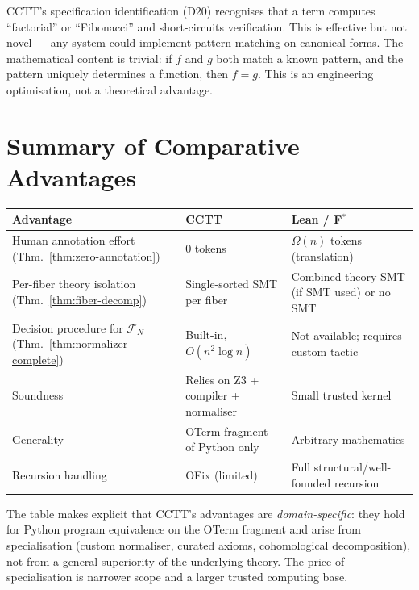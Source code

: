 CCTT's specification identification (D20) recognises that a term
computes ``factorial'' or ``Fibonacci'' and short-circuits verification.
This is effective but not novel — any system could implement
pattern matching on canonical forms.  The mathematical content is
trivial: if $f$ and $g$ both match a known pattern, and the pattern
uniquely determines a function, then $f = g$.  This is an engineering
optimisation, not a theoretical advantage.


\section{Summary of Comparative Advantages}
\label{sec:adv-summary}

\begin{center}
\renewcommand{\arraystretch}{1.3}
\begin{tabular}{>{\raggedright\arraybackslash}p{4cm}
                >{\raggedright\arraybackslash}p{4cm}
                >{\raggedright\arraybackslash}p{4.5cm}}
  \toprule
  \textbf{Advantage} & \textbf{CCTT} & \textbf{Lean / F${}^*$} \\
  \midrule
  Human annotation effort (Thm.~\ref{thm:zero-annotation})
    & $0$ tokens
    & $\Omega(n)$ tokens (translation) \\[3pt]
  Per-fiber theory isolation (Thm.~\ref{thm:fiber-decomp})
    & Single-sorted SMT per fiber
    & Combined-theory SMT (if SMT used) or no SMT \\[3pt]
  Decision procedure for $\mathcal{F}_N$ (Thm.~\ref{thm:normalizer-complete})
    & Built-in, $O(n^2 \log n)$
    & Not available; requires custom tactic \\[3pt]
  \midrule
  Soundness
    & Relies on Z3 + compiler + normaliser
    & Small trusted kernel \\[3pt]
  Generality
    & OTerm fragment of Python only
    & Arbitrary mathematics \\[3pt]
  Recursion handling
    & OFix (limited)
    & Full structural/well-founded recursion \\
  \bottomrule
\end{tabular}
\end{center}

The table makes explicit that CCTT's advantages are \emph{domain-specific}:
they hold for Python program equivalence on the OTerm fragment and
arise from specialisation (custom normaliser, curated axioms,
cohomological decomposition), not from a general superiority of the
underlying theory.  The price of specialisation is narrower scope and
a larger trusted computing base.

